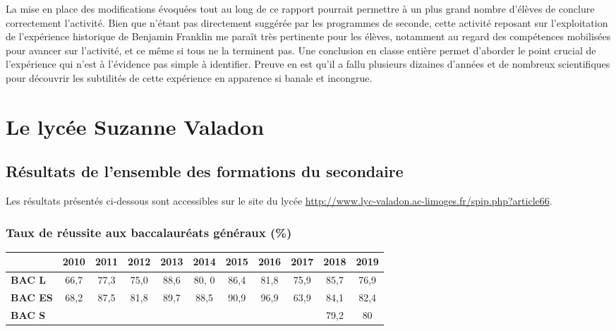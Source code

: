 \documentclass[12pt,a4paper, fleqn]{report}
\begin{document}
La mise en place des modifications évoquées tout au long de ce rapport pourrait permettre à un plus grand nombre d'élèves de conclure correctement l'activité.
Bien que n'étant pas directement suggérée par les programmes de seconde, cette activité reposant sur l'exploitation de l'expérience historique de Benjamin Franklin me paraît très pertinente pour les élèves, notamment au regard des compétences mobilisées pour avancer sur l'activité, et ce même si tous ne la terminent pas.
Une conclusion en classe entière permet d'aborder le point crucial de l'expérience qui n'est à l'évidence pas simple à identifier.
Preuve en est qu'il a fallu plusieurs dizaines d'années et de nombreux scientifiques pour découvrir les subtilités de cette expérience en apparence si banale et incongrue.

\newpage


\newpage
\appendix

\chapter{Le lycée Suzanne Valadon}

\section{Résultats de l'ensemble des formations du secondaire}
\label{ann:resultats}

Les résultats présentés ci-dessous sont accessibles sur le site du lycée \href{http://www.lyc-valadon.ac-limoges.fr/spip.php?article66}{http://www.lyc-valadon.ac-limoges.fr/spip.php?article66}.

\subsection{Taux de réussite aux baccalauréats généraux (\%)}

\begin{center}
\begin{tabular}{l|c|c|c|c|c|c|c|c|c|c}
		& \textbf{2010} & \textbf{2011} & \textbf{2012} & \textbf{2013} & \textbf{2014} & \textbf{2015} & \textbf{2016} & \textbf{2017} & \textbf{2018} & \textbf{2019} \\
\hline \hline
\textbf{BAC L} 		& 66{,}7 & 77{,}3 & 75{,}0 & 88{,}6 & 80{,} 0 & 86{,}4 & 81{,}8 & 75{,}9 & 85{,}7 & 76{,}9 \\
\hline
\textbf{BAC ES} 	& 68{,}2 & 87{,}5 & 81{,}8 & 89{,}7 & 88{,}5 & 90{,}9 & 96{,}9 & 63{,}9 & 84{,}1 & 82{,}4 \\
\hline
\textbf{BAC S}		& & & & & & & & & 79{,}2 & 80 \\
\end{tabular}
\end{center}
\end{document}
